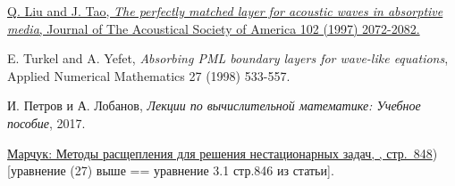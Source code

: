 \begin{thebibliography}{9}
	 \href{https://pdfs.semanticscholar.org/1a02/d9bec66394d79e2c716213aa7e73d5171b0a.pdf}{ Q. Liu and J. Tao, \textit{The perfectly matched layer for acoustic waves in absorptive media}, Journal of The Acoustical Society of America 102  (1997) 2072-2082.}
	
	  E. Turkel and A. Yefet, \textit{Absorbing PML boundary layers for wave-like equations}, Applied Numerical Mathematics 27 (1998) 533-557.
	
	  И. Петров и А. Лобанов, \textit{Лекции по вычислительной математике: Учебное пособие}, 2017.
	
	 \href{http://www.mathnet.ru/links/804fe31f9ef894bfe997bbca572c38e7/zvmmf2383.pdf}{Марчук: Методы расщепления для решения нестационарных задач, , стр.~848}) [уравнение (27) выше == уравнение 3.1 стр.846 из статьи].
\end{thebibliography}
